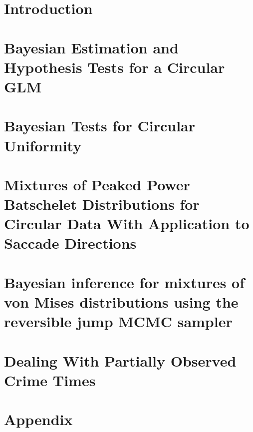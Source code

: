 \documentclass[12pt, a4paper]{book}\usepackage[]{graphicx}\usepackage[]{color}
\begin{document}
\frontmatter
\tableofcontents



\mainmatter
\chapter{Introduction}
\label{intro}
% 


\chapter{Bayesian Estimation and Hypothesis Tests for a Circular GLM}
\label{circglm}



\chapter{Bayesian Tests for Circular Uniformity}
\label{hypotest}



\chapter{Mixtures of Peaked Power Batschelet Distributions for Circular Data  With Application to Saccade Directions}
\label{flexcmix}

%
%
\chapter{Bayesian inference for mixtures of von Mises distributions using the reversible jump MCMC sampler}
\label{revrjump}

%
\chapter{Dealing With Partially Observed Crime Times}
\label{dpm_crim}

%
% 





\chapter{Appendix}

\appendix






\backmatter



\end{document}

